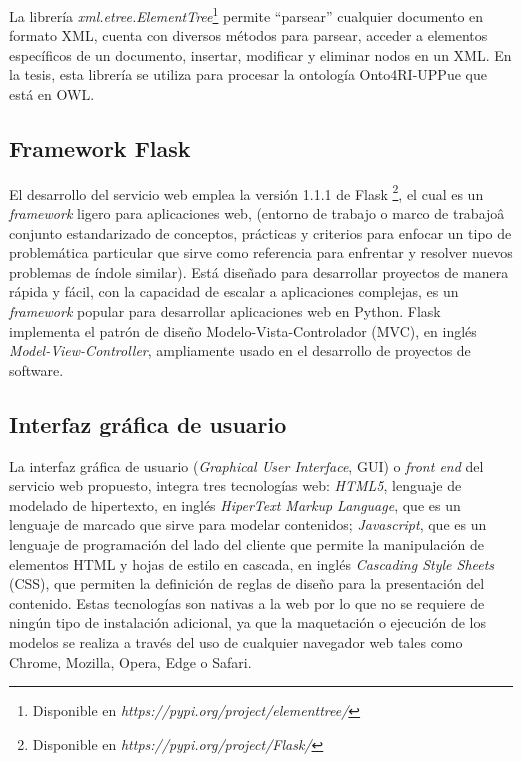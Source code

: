 La librer\'ia \textit{xml.etree.ElementTree}\footnote{Disponible en \textit{https://pypi.org/project/elementtree/}} permite ``parsear'' cualquier documento en formato XML, cuenta con diversos m\'etodos para parsear, acceder a elementos espec\'ificos de un documento, insertar, modificar y eliminar nodos en un XML. En la tesis, esta librer\'ia se utiliza para procesar la ontolog\'ia Onto4RI-UPPue que est\'a en OWL.

\subsection{Framework Flask}

El desarrollo del servicio web emplea la versi\'on 1.1.1 de Flask \footnote{Disponible en \emph{https://pypi.org/project/Flask/}}, el cual es un \emph{framework} ligero para aplicaciones web, (entorno de trabajo o marco de trabajoâ conjunto estandarizado de conceptos, pr\'acticas y criterios para enfocar un tipo de problem\'atica particular que sirve como referencia para enfrentar y resolver nuevos problemas de \'indole similar). Est\'a dise\~{n}ado para desarrollar proyectos de manera r\'apida y f\'acil, con la capacidad de escalar a aplicaciones complejas, es un \emph{framework} popular para desarrollar aplicaciones web en Python. Flask implementa el patr\'on de dise\~{n}o Modelo-Vista-Controlador (MVC), en ingl\'es \emph{Model-View-Controller}, ampliamente usado en el desarrollo de proyectos de software. 

\subsection{Interfaz gr\'afica de usuario}

La interfaz gr\'afica de usuario (\emph{Graphical User Interface}, GUI) o \emph{front end} del servicio web propuesto, integra tres tecnolog\'ias web: 
\emph{HTML5}, lenguaje de modelado de hipertexto, en ingl\'es \emph{HiperText Markup Language}, que es un lenguaje de marcado que sirve para modelar contenidos; \emph{Javascript}, que es un lenguaje de programaci\'on del lado del cliente que permite la manipulaci\'on de elementos HTML y hojas de estilo en cascada, en ingl\'es \emph{Cascading Style Sheets} (CSS), que permiten la definici\'on de reglas de dise\~{n}o para la presentaci\'on del contenido. Estas tecnolog\'ias son nativas a la web por lo que no se requiere de ning\'un tipo de instalaci\'on adicional, ya que la maquetaci\'on o ejecuci\'on de los modelos se realiza a trav\'es del uso de cualquier navegador web tales como Chrome, Mozilla, Opera, Edge o Safari.


